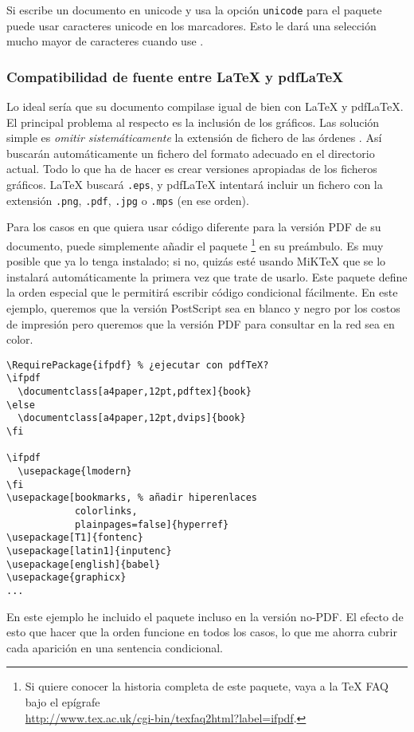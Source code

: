 Si escribe un documento en unicode y usa la opción \verb+unicode+ para
el paquete  puede usar caracteres unicode en los
marcadores.  Esto le dará una selección mucho mayor de caracteres
cuando use .

\subsubsection{Compatibilidad de fuente entre \LaTeX{} y pdf\LaTeX{}}
\label{sec:pdfcompat}

Lo ideal sería que su documento compilase igual de bien con \LaTeX{} y
pdf\LaTeX{}.  El principal problema al respecto es la inclusión de los
gráficos.  Las solución simple es  \emph{omitir sistemáticamente} la
extensión de fichero de las órdenes .  Así
buscarán automáticamente un fichero del formato adecuado en el
directorio actual.  Todo lo que ha de hacer es crear versiones
apropiadas de los ficheros gráficos.  \LaTeX{} buscará \texttt{.eps},
y  pdf\LaTeX{} intentará incluir un fichero con la extensión
\texttt{.png}, \texttt{.pdf}, \texttt{.jpg} o \texttt{.mps}
(en ese orden).

Para los casos en que quiera usar código diferente para la versión
PDF de su documento, puede simplemente añadir el paquete %
\footnote{Si quiere conocer la historia completa de este paquete, vaya
   a la \TeX{} FAQ bajo el epígrafe\\
   \url{http://www.tex.ac.uk/cgi-bin/texfaq2html?label=ifpdf}.}  en su
   preámbulo.  Es muy posible que ya lo tenga instalado; si no, quizás
   esté usando MiK\TeX{} que se lo instalará automáticamente la
   primera vez que trate de usarlo.  Este paquete define la orden
   especial
 que le permitirá escribir código condicional fácilmente.
   En este ejemplo, queremos que la versión
PostScript sea en blanco y negro por los costos de impresión pero
   queremos que la versión PDF para consultar en la red sea en color.
\begin{code}
\begin{verbatim}
\RequirePackage{ifpdf} % ¿ejecutar con pdfTeX?
\ifpdf
  \documentclass[a4paper,12pt,pdftex]{book}
\else
  \documentclass[a4paper,12pt,dvips]{book}
\fi

\ifpdf
  \usepackage{lmodern}
\fi
\usepackage[bookmarks, % añadir hiperenlaces
            colorlinks,
            plainpages=false]{hyperref}                    
\usepackage[T1]{fontenc}
\usepackage[latin1]{inputenc}
\usepackage[english]{babel}
\usepackage{graphicx}
...
\end{verbatim}
\end{code}
En este ejemplo he incluido el paquete  incluso en la
versión no-PDF.  El efecto de esto que hacer que la orden  
funcione en todos los casos, lo que me ahorra cubrir cada aparición en
una sentencia condicional.

